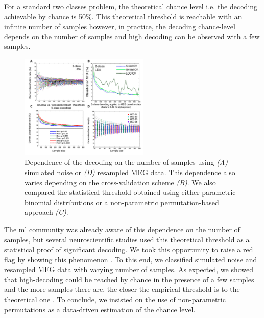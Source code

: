 \documentclass[a4paper,11pt]{article}
\begin{document}
For a standard two classes problem, the theoretical chance level i.e. the decoding achievable by chance is 50\%. This theoretical threshold is reachable with an infinite number of samples however, in practice, the decoding chance-level depends on the number of samples and high decoding can be observed with a few samples. 

\begin{figure} %
    \centering
    \includegraphics[width=0.55\textwidth]{figures/report/chance_level.png}
    \caption{Dependence of the decoding on the number of samples using \textit{(A)} simulated noise or \textit{(D)} resampled MEG data. This dependence also varies depending on the cross-validation scheme \textit{(B)}. We also compared the statistical threshold obtained using either parametric binomial distributions or a non-parametric permutation-based approach \textit{(C)}.}
    \label{fig_chance_level}
\end{figure}

The \ac{ml} community was already aware of this dependence on the number of samples, but several neuroscientific studies used this theoretical threshold as a statistical proof of significant decoding. We took this opportunity to raise a red flag by showing this phenomenon \citep{combrisson2015exceeding}. To this end, we classified simulated noise and resampled MEG data with varying number of samples. As expected, we showed that high-decoding could be reached by chance in the presence of a few samples and the more samples there are, the closer the empirical threshold is to the theoretical one . To conclude, we insisted on the use of non-parametric permutations as a data-driven estimation of the chance level.

\end{document}
